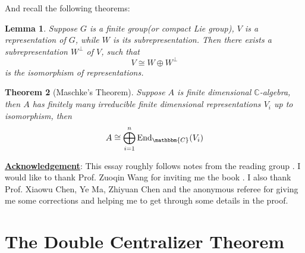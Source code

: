 \documentclass[11pt,oneside]{amsart}
\numberwithin{equation}{section}
\theoremstyle{plain}
\newtheorem{theorem}{Theorem}[section]
\newtheorem{lemma}[theorem]{Lemma}
\theoremstyle{plain}
\numberwithin{equation}{section}
\theoremstyle{remark}
\newcommand{\exist}{ there exists }
\newcommand{\st}{ such that }
\newcommand{\End}{\operatorname{End}}
\begin{document}
	And recall the following theorems:
	\begin{lemma}\label{lemma:perp}
		Suppose $G$ is a finite group(or compact Lie group), $V$ is a representation of $G$, while $W$ is its subrepresentation. Then\exist a subrepresentation $W^{\perp}$ of $V$, \st 
		$$V\cong W \oplus W^{\perp}$$
		is the isomorphism of representations. 
	\end{lemma}
 
 \begin{theorem}[Maschke’s Theorem]
 	Suppose $A$ is finite dimensional $\mathbb{C}$-algebra, then $A$ has finitely many irreducible finite dimensional representations $V_i$ up to isomorphism, then
 	$$A \cong \bigoplus_{i=1}^n \End_{\mathbbm{C}}(V_i)$$
 \end{theorem}
	\noindent\underline{\bf{Acknowledgement}}: This essay roughly follows notes from the reading group \cite{SWduality}. I would like to thank Prof. Zuoqin Wang for inviting me the book \cite{howe1995perspectives}. I also thank Prof. Xiaowu Chen, Ye Ma, Zhiyuan Chen and the anonymous referee for giving me some corrections and helping me to get through some details in the proof.
	\section{The Double Centralizer Theorem}
	
\end{document}
